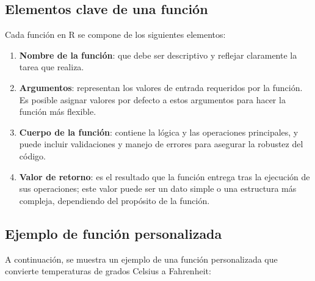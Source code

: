 \documentclass[
  spanish,
  a4paper,
  DIV=11,
  numbers=noendperiod,
  onepage,
  openany]{scrreprt}
\begin{document}
\subsection{Elementos clave de una
función}\label{elementos-clave-de-una-funciuxf3n}

Cada función en R se compone de los siguientes elementos:

\begin{enumerate}
\def\labelenumi{\arabic{enumi}.}
\item
  \textbf{Nombre de la función}: que debe ser descriptivo y reflejar
  claramente la tarea que realiza.
\item
  \textbf{Argumentos}: representan los valores de entrada requeridos por
  la función. Es posible asignar valores por defecto a estos argumentos
  para hacer la función más flexible.
\item
  \textbf{Cuerpo de la función}: contiene la lógica y las operaciones
  principales, y puede incluir validaciones y manejo de errores para
  asegurar la robustez del código.
\item
  \textbf{Valor de retorno}: es el resultado que la función entrega tras
  la ejecución de sus operaciones; este valor puede ser un dato simple o
  una estructura más compleja, dependiendo del propósito de la función.
\end{enumerate}

\subsection{Ejemplo de función
personalizada}\label{ejemplo-de-funciuxf3n-personalizada}

A continuación, se muestra un ejemplo de una función personalizada que
convierte temperaturas de grados Celsius a Fahrenheit:
\end{document}
